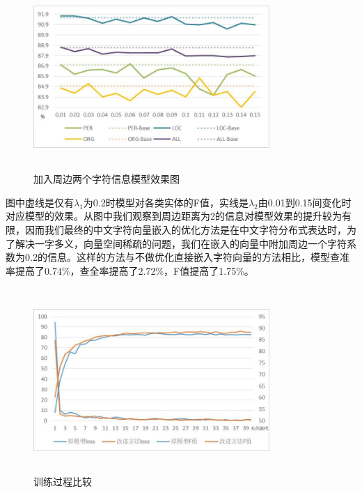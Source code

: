\documentclass[winfonts,master,oneside,nobackinfo]{njuthesis}
\begin{document}
\begin{figure}[H]
\centering
\begin{minipage}[t]{\textwidth}
\includegraphics[width=0.8\textwidth,height=7cm]{./figure/参数2.jpg}
\caption{加入周边两个字符信息模型效果图}
\label{lab:1}
\end{minipage}
\end{figure}

图中虚线是仅有$\lambda_{1}$为0.2时模型对各类实体的F值，实线是$\lambda_{2}$由0.01到0.15间变化时对应模型的效果。从图中我们观察到周边距离为2的信息对模型效果的提升较为有限，因而我们最终的中文字符向量嵌入的优化方法是在中文字符分布式表达时，为了解决一字多义，向量空间稀疏的问题，我们在嵌入的向量中附加周边一个字符系数为0.2的信息。这样的方法与不做优化直接嵌入字符向量的方法相比，模型查准率提高了0.74\%，查全率提高了2.72\%，F值提高了1.75\%。

\begin{figure}[H]
\centering
\begin{minipage}[t]{\textwidth}
\includegraphics[width=0.8\textwidth,height=7cm]{./figure/训练过程.jpg}
\caption{训练过程比较}
\label{lab:1}
\end{minipage}
\end{figure}
\end{document}
